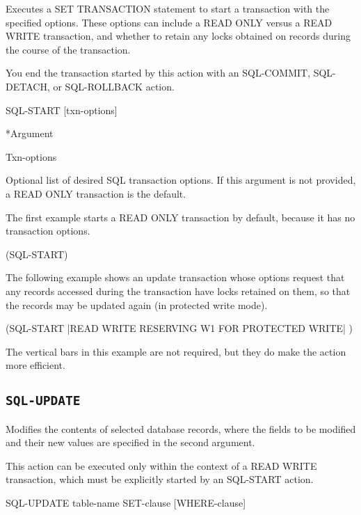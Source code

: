 {{Executes a SET TRANSACTION statement to start a transaction
with the specified options. These options can include a READ
ONLY versus a READ WRITE transaction, and whether to retain
any locks obtained on records during the course of the
transaction.

You end the transaction started by this action with an
SQL-COMMIT, SQL-DETACH, or SQL-ROLLBACK action.



\Format

SQL-START [txn-options]



*Argument

Txn-options

Optional list of desired SQL transaction options. If this
argument is not provided, a READ ONLY transaction is the
default.



\Example

The first example starts a READ ONLY transaction by default,
because it has no transaction options.



(SQL-START)



The following example shows an update transaction whose
options request that any records accessed during the
transaction have locks retained on them, so that the records
may be updated again (in protected write mode).



(SQL-START |READ WRITE RESERVING W1 FOR PROTECTED WRITE| )



The vertical bars in this example are not required, but they
do make the action more efficient.

\subsection{\tt{SQL-UPDATE}}

Modifies the contents of selected database records, where the
fields to be modified and their new values are specified in
the second argument.

This action can be executed only within the context of a READ
WRITE transaction, which must be explicitly started by an
SQL-START action.



\Format

SQL-UPDATE table-name SET-clause [WHERE-clause]



}}
